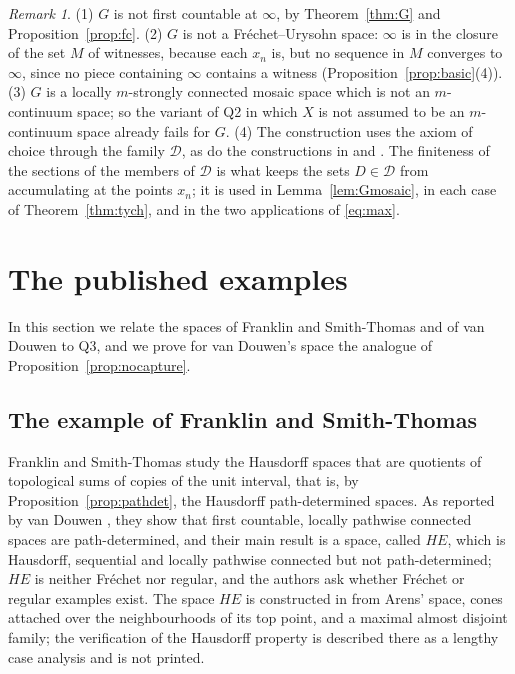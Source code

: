 \documentclass[11pt]{amsart}
\theoremstyle{definition}
\theoremstyle{remark}
\newtheorem{remark}[theorem]{Remark}
\newcommand{\cD}{\mathcal{D}}
\newcommand{\HE}{\mathit{HE}}
\numberwithin{equation}{section}
\begin{document}
\begin{remark}\label{rem:Gprops}
(1) $G$ is not first countable at $\infty$, by Theorem~\ref{thm:G} and Proposition~\ref{prop:fc}. (2) $G$ is not a Fr\'echet--Urysohn space: $\infty$ is in the closure of the set $M$ of witnesses, because each $x_n$ is, but no sequence in $M$ converges to $\infty$, since no piece containing $\infty$ contains a witness (Proposition~\ref{prop:basic}(4)). (3) $G$ is a locally $m$-strongly connected mosaic space which is not an $m$-continuum space; so the variant of Q2 in which $X$ is not assumed to be an $m$-continuum space already fails for $G$. (4) The construction uses the axiom of choice through the family $\cD$, as do the constructions in \cite{fst79} and \cite{vandouwen81}. The finiteness of the sections of the members of $\cD$ is what keeps the sets $D\in\cD$ from accumulating at the points $x_n$; it is used in Lemma~\ref{lem:Gmosaic}, in each case of Theorem~\ref{thm:tych}, and in the two applications of \eqref{eq:max}.
\end{remark}

\section{The published examples}\label{sec:published}
In this section we relate the spaces of Franklin and Smith-Thomas and of van Douwen to Q3, and we prove for van Douwen's space the analogue of Proposition~\ref{prop:nocapture}.

\subsection{The example of Franklin and Smith-Thomas}\label{sec:fst}
Franklin and Smith-Thomas \cite{fst79} study the Hausdorff spaces that are quotients of topological sums of copies of the unit interval, that is, by Proposition~\ref{prop:pathdet}, the Hausdorff path-determined spaces. As reported by van Douwen \cite[p.~424]{vandouwen81}, they show that first countable, locally pathwise connected spaces are path-determined, and their main result is a space, called $\HE$, which is Hausdorff, sequential and locally pathwise connected but not path-determined; $\HE$ is neither Fr\'echet nor regular, and the authors ask \cite[4.2, 4.4]{fst79} whether Fr\'echet or regular examples exist. The space $\HE$ is constructed in \cite[Section~3]{fst79} from Arens' space, cones attached over the neighbourhoods of its top point, and a maximal almost disjoint family; the verification of the Hausdorff property is described there as a lengthy case analysis and is not printed.
\end{document}
